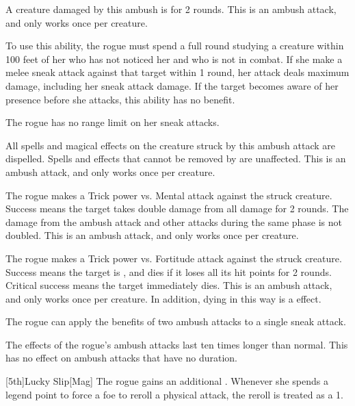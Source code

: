         A creature damaged by this ambush is \immobilized for 2 rounds.
        This is an ambush attack, and only works once per creature.

        To use this ability, the rogue must spend a full round studying a creature within 100 feet of her who has not noticed her and who is not in combat.
        If she make a melee sneak attack against that target within 1 round, her attack deals maximum damage, including her sneak attack damage.
        If the target becomes aware of her presence before she attacks, this ability has no benefit.

        The rogue has no range limit on her sneak attacks.

        All spells and magical effects on the creature struck by this ambush attack are dispelled.
        Spells and effects that cannot be removed by  are unaffected.
        This is an ambush attack, and only works once per creature.

        The rogue makes a Trick power vs. Mental attack against the struck creature.
        Success means the target takes double damage from all damage for 2 rounds.
        The damage from the ambush attack and other attacks during the same phase is not doubled.
        This is an ambush attack, and only works once per creature.

        The rogue makes a Trick power vs. Fortitude attack against the struck creature.
        Success means the target is \staggered, and dies if it loses all its hit points for 2 rounds.
        Critical success means the target immediately dies.
        This is an ambush attack, and only works once per creature.
        In addition, dying in this way is a  effect.

        The rogue can apply the benefits of two ambush attacks to a single sneak attack.

        The effects of the rogue's ambush attacks last ten times longer than normal.
        This has no effect on ambush attacks that have no duration.

        [5th]{Lucky Slip}[Mag]
        The rogue gains an additional .
        Whenever she spends a legend point to force a foe to reroll a physical attack, the reroll is treated as a 1.

